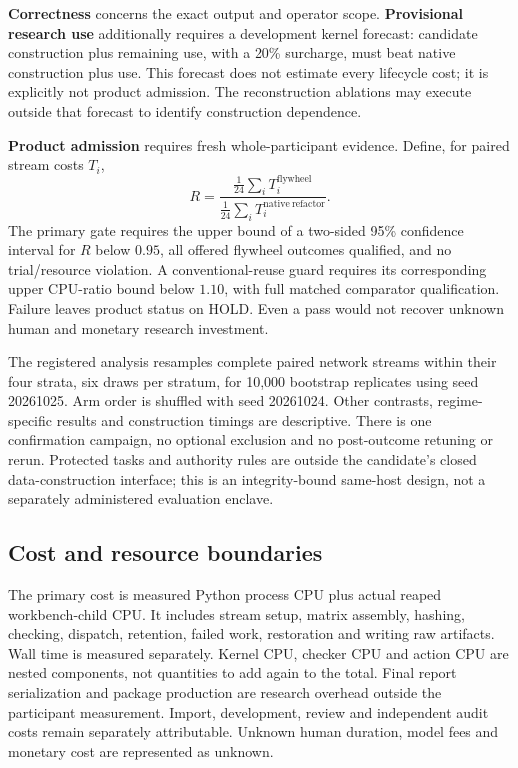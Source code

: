\textbf{Correctness} concerns the exact output and operator scope. \textbf{Provisional research use} additionally
requires a development kernel forecast: candidate construction plus remaining use, with a 20\% surcharge, must
beat native construction plus use. This forecast does not estimate every lifecycle cost; it is explicitly not
product admission. The reconstruction ablations may execute outside that forecast to identify construction dependence.

\textbf{Product admission} requires fresh whole-participant evidence. Define, for paired stream costs $T_i$,
\begin{equation}
 R=\frac{\frac{1}{24}\sum_i T_i^{\mathrm{flywheel}}}
          {\frac{1}{24}\sum_i T_i^{\mathrm{native\ refactor}}}.
\end{equation}
The primary gate requires the upper bound of a two-sided 95\% confidence interval for $R$ below $0.95$,
all offered flywheel outcomes qualified, and no trial/resource violation. A conventional-reuse guard requires
its corresponding upper CPU-ratio bound below $1.10$, with full matched comparator qualification. Failure
leaves product status on HOLD. Even a pass would not recover unknown human and monetary research investment.

The registered analysis resamples complete paired network streams within their four strata, six draws per
stratum, for 10,000 bootstrap replicates using seed 20261025. Arm order is shuffled with seed 20261024. Other
contrasts, regime-specific results and construction timings are descriptive. There is one confirmation campaign,
no optional exclusion and no post-outcome retuning or rerun. Protected tasks and authority rules are outside
the candidate's closed data-construction interface; this is an integrity-bound same-host design, not a separately
administered evaluation enclave.

\subsection{Cost and resource boundaries}

The primary cost is measured Python process CPU plus actual reaped workbench-child CPU. It includes stream
setup, matrix assembly, hashing, checking, dispatch, retention, failed work, restoration and writing raw artifacts.
Wall time is measured separately. Kernel CPU, checker CPU and action CPU are nested components, not quantities
to add again to the total. Final report serialization and package production are research overhead outside the
participant measurement. Import, development, review and independent audit costs remain separately attributable.
Unknown human duration, model fees and monetary cost are represented as unknown.

